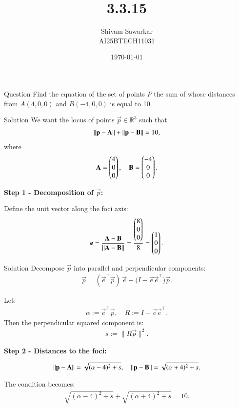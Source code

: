 \documentclass{beamer}
\title %
{3.3.15}
\date{\today}
\author %
{Shivam Sawarkar \\ AI25BTECH11031}
\begin{document}
\frame{\titlepage}
\begin{frame}{Question}
    Find the equation of the set of points $P$ the sum of whose distances from $A(4, 0, 0)$ and $B(-4, 0, 0)$ is equal to 10.
\end{frame}

\begin{frame}{Solution}
    We want the locus of points $\vec{p} \in \mathbb{R}^3$ such that
\begin{align}
\left\lVert\mathbf{p}-\mathbf{A}\right\rVert+\left\lVert\mathbf{p}-\mathbf{B}\right\rVert = 10,
\end{align}
where
\begin{align}
\mathbf{A} = \begin{pmatrix}4 \\ 0 \\ 0\end{pmatrix}, \quad
\mathbf{B} = \begin{pmatrix}-4 \\ 0 \\ 0\end{pmatrix}.
\end{align}

\textbf{Step 1 - Decomposition of $\vec{p}$:}

Define the unit vector along the foci axis:
\begin{align}
\mathbf{e} = \frac{\mathbf{A} - \mathbf{B}}{\left\lVert\mathbf{A}-\mathbf{B}\right\rVert}
= \frac{\begin{pmatrix}8 \\ 0 \\ 0\end{pmatrix}}{8} = \begin{pmatrix}1 \\ 0 \\ 0\end{pmatrix}.
\end{align}
\end{frame}

\begin{frame}{Solution}
    Decompose $\vec{p}$ into parallel and perpendicular components:
\begin{align}
\vec{p} = (\vec{e}^\top \vec{p})\,\vec{e}
+ \big( I - \vec{e}\vec{e}^\top \big) \vec{p}.
\end{align}

Let:
\begin{align}
\alpha := \vec{e}^\top \vec{p}, \quad
R := I - \vec{e}\vec{e}^\top.
\end{align}
Then the perpendicular squared component is:
\begin{align}
s := \|R\vec{p}\|^2.
\end{align}

\textbf{Step 2 - Distances to the foci:}

\begin{align}
\left\lVert\mathbf{p}-\mathbf{A}\right\rVert
= \sqrt{(\alpha - 4)^2 + s}, \quad
\left\lVert\mathbf{p}-\mathbf{B}\right\rVert
= \sqrt{(\alpha + 4)^2 + s}.
\end{align}

The condition becomes:
\begin{align}
\sqrt{(\alpha - 4)^2 + s} + \sqrt{(\alpha + 4)^2 + s} = 10.
\end{align}
\end{frame}
\end{document}
